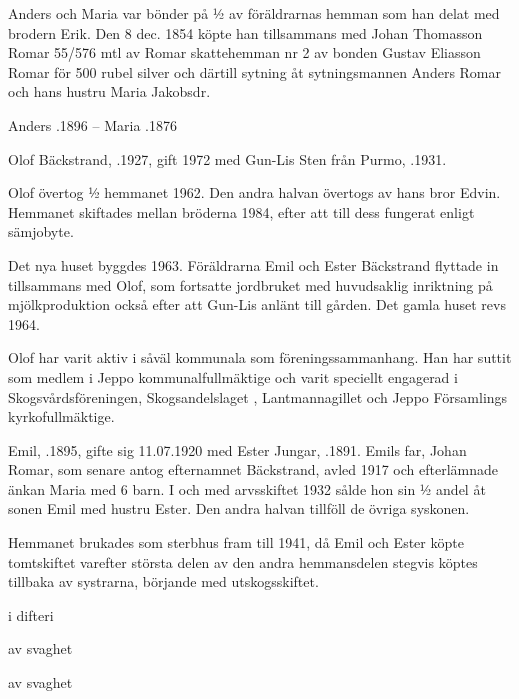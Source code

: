 Anders och Maria var bönder på ½  av föräldrarnas hemman som han delat med brodern Erik. Den 8 dec. 1854 köpte han tillsammans med Johan Thomasson Romar 55/576 mtl av Romar skattehemman nr 2 av bonden Gustav Eliasson Romar för 500 rubel silver och därtill sytning åt sytningsmannen Anders Romar och hans hustru Maria Jakobsdr.

Anders .1896  --  Maria  .1876






Olof Bäckstrand, .1927, gift 1972 med Gun-Lis Sten från Purmo, .1931.

Olof övertog  ½ hemmanet 1962. Den andra  halvan övertogs av hans bror Edvin. Hemmanet skiftades mellan bröderna 1984, efter att till dess fungerat enligt sämjobyte.

Det nya huset byggdes 1963. Föräldrarna Emil och Ester Bäckstrand flyttade in tillsammans med Olof, som fortsatte jordbruket med huvudsaklig inriktning på mjölkproduktion också efter att Gun-Lis anlänt till gården. Det gamla huset revs 1964.

Olof har varit aktiv i såväl kommunala som föreningssammanhang. Han har suttit som medlem i Jeppo kommunalfullmäktige och varit speciellt engagerad i Skogsvårdsföreningen, Skogsandelslaget , Lantmannagillet och Jeppo Församlings kyrkofullmäktige.





Emil, .1895, gifte sig 11.07.1920 med Ester Jungar, .1891. Emils far, Johan Romar, som senare antog efternamnet Bäckstrand, avled 1917 och efterlämnade änkan Maria med 6 barn. I och med arvsskiftet 1932 sålde hon sin ½ andel åt sonen Emil  med hustru Ester. Den andra halvan tillföll de övriga syskonen.

Hemmanet brukades som sterbhus fram till 1941, då Emil och Ester köpte tomtskiftet varefter största delen av den andra hemmansdelen stegvis köptes tillbaka av systrarna, börjande med utskogsskiftet.
\begin{jhchildren}
  \item {}
  \item {} i difteri
  \item {}
  \item {}
  \item {} av svaghet
  \item {} av svaghet
\end{jhchildren}


